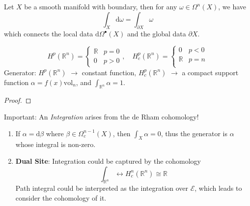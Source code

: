\documentclass[10pt]{article}
\begin{document}
\begin{theorem}
  Let $ X$ be a smooth manifold with boundary, then for any $ \omega \in \Omega^{n}(X)$, we have
  \begin{equation*}
    \int_{X} \mathrm{d} \omega = \int _{\partial X} \omega
  \end{equation*}
  which connects the local data $ \mathrm{d} \Omega^{\bullet}(X)$ and the global data $\partial X$.
\end{theorem}
\begin{theorem}
  \begin{equation*}
    H^{p}(\mathbb{R}^{n}) =
    \begin{cases}
      \mathbb{R} & p = 0 \\
      0 & p > 0
    \end{cases}, \quad
    H^{p}_{c}(\mathbb{R}^{n}) =
    \begin{cases}
      0 & p <0 \\
      \mathbb{R} & p = n \\
    \end{cases}
  \end{equation*}
  Generator: $ H^{p}(\mathbb{R}^{n})$ $\rightarrow $ constant function, $ H^{p}_{c}(\mathbb{R}^{n})$ $\rightarrow $ a compact support function $ \alpha = f(x) \mathrm{vol}_{n}$, and $ \int _{\mathbb{R}^{n}} \alpha = 1$.
\end{theorem}
\begin{proof}

\end{proof}
Important: An \emph{Integration} arises from the de Rham cohomology!
\begin{observation}
  \begin{enumerate}[(1)]
    \item If $ \alpha = \mathrm{d} \beta$ where $ \beta \in \Omega_{c}^{n-1}(X)$, then $ \int _{X} \alpha = 0$, thus the generator is $ \alpha$ whose integral is non-zero.
    \item \textbf{Dual Site}: Integration could be captured by the cohomology
      \begin{equation*}
        \int _{\mathbb{R}^{n}} \leftrightarrow H^{n}_{c}(\mathbb{R}^{n}) \cong \mathbb{R}
      \end{equation*}
      Path integral could be interpreted as the integration over $ \mathcal{E}$, which leads to consider the cohomology of it.
  \end{enumerate}
\end{observation}
\end{document}
